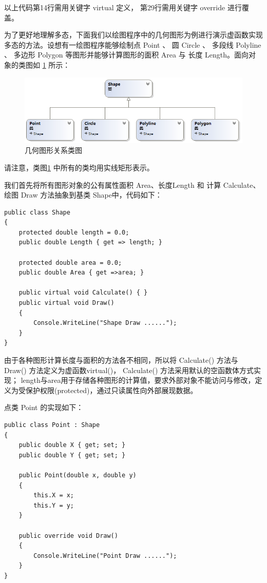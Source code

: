 以上代码第14行需用关键字 virtual 定义， 第29行需用关键字 override 进行覆盖。


为了更好地理解多态，下面我们以绘图程序中的几何图形为例进行演示虚函数实现多态的方法。设想有一绘图程序能够绘制点 Point 、 圆 Circle 、 多段线 Polyline 、 多边形 Polygon 等图形并能够计算图形的面积 Area 与 长度 Length。面向对象的类图如 \ref{fig:graph} 所示：

\begin{figure}[htbp]
	\centering
	\includegraphics[scale=0.6]{chapter/csobject/graph.png}
	\caption{几何图形关系类图}
	\label{fig:graph}
\end{figure}

请注意，类图\ref{fig:graph} 中所有的类均用实线矩形表示。

我们首先将所有图形对象的公有属性面积 Area、长度Length 和 计算 Calculate、绘图 Draw 方法抽象到基类 Shape中，代码如下：

\begin{lstlisting}
public class Shape
{
	protected double length = 0.0;
	public double Length { get => length; }
	
	protected double area = 0.0;
	public double Area { get =>area; }
	
	public virtual void Calculate() { }
	public virtual void Draw()
	{
		Console.WriteLine("Shape Draw ......");
	}
}
\end{lstlisting}

由于各种图形计算长度与面积的方法各不相同，所以将 Calculate() 方法与 Draw() 方法定义为虚函数virtual()， Calculate() 方法采用默认的空函数体方式实现；
length与area用于存储各种图形的计算值，要求外部对象不能访问与修改，定义为受保护权限(protected)，通过只读属性向外部展现数据。

点类 Point 的实现如下：

\begin{lstlisting}
public class Point : Shape
{      
	public double X { get; set; }
	public double Y { get; set; }        
	
	public Point(double x, double y)
	{          
		this.X = x;
		this.Y = y;          
	}
	
	public override void Draw()
	{
		Console.WriteLine("Point Draw ......");
	}
}
\end{lstlisting}

